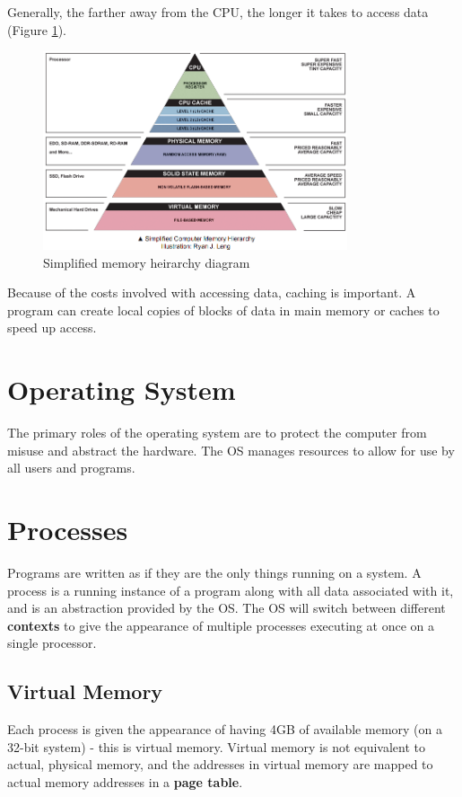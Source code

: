 \documentclass[11pt]{article}
\begin{document}
	Generally, the farther away from the CPU, the longer it takes to access data (Figure \ref{fig:memory}).
	
	\begin{figure}[htb]
		\centering
		\includegraphics[width=0.8\textwidth]{hei.png}
		\caption{Simplified memory heirarchy diagram}
		\label{fig:memory}
	\end{figure}
	
	Because of the costs involved with accessing data, caching is important. A program can create local copies of blocks of data in main memory or caches to speed up access.

\section{Operating System}
	The primary roles of the operating system are to protect the computer from misuse and abstract the hardware. The OS manages resources to allow for use by all users and programs.
		
\section{Processes}
	Programs are written as if they are the only things running on a system. A process is a running instance of a program along with all data associated with it, and is an abstraction provided by the OS. The OS will switch between different \textbf{contexts} to give the appearance of multiple processes executing at once on a single processor.
	
	\subsection{Virtual Memory}
		Each process is given the appearance of having 4GB of available memory (on a 32-bit system) - this is virtual memory. Virtual memory is not equivalent to actual, physical memory, and the addresses in virtual memory are mapped to actual memory addresses in a \textbf{page table}.
		
\end{document}
